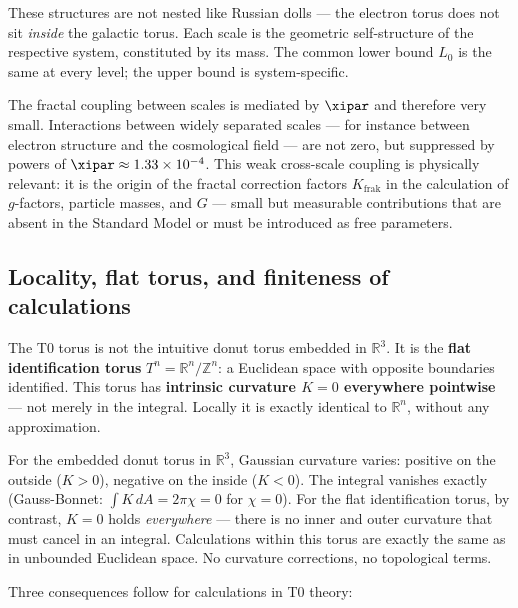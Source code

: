\begin{keypoint}
These structures are not nested like Russian dolls — the electron torus does not sit \textit{inside} the galactic torus. Each scale is the geometric self-structure of the respective system, constituted by its mass. The common lower bound $L_0$ is the same at every level; the upper bound is system-specific.

The fractal coupling between scales is mediated by $\xipar$ and therefore very small. Interactions between widely separated scales — for instance between electron structure and the cosmological field — are not zero, but suppressed by powers of $\xipar \approx 1{.}33 \times 10^{-4}$. This weak cross-scale coupling is physically relevant: it is the origin of the fractal correction factors $K_{\text{frak}}$ in the calculation of $g$-factors, particle masses, and $G$ — small but measurable contributions that are absent in the Standard Model or must be introduced as free parameters.
\end{keypoint}

\subsection{Locality, flat torus, and finiteness of calculations}

The T0 torus is not the intuitive donut torus embedded in $\mathbb{R}^3$. It is the \textbf{flat identification torus} $T^n = \mathbb{R}^n / \mathbb{Z}^n$: a Euclidean space with opposite boundaries identified. This torus has \textbf{intrinsic curvature $K = 0$ everywhere pointwise} — not merely in the integral. Locally it is exactly identical to $\mathbb{R}^n$, without any approximation.

\begin{keypoint}
For the embedded donut torus in $\mathbb{R}^3$, Gaussian curvature varies: positive on the outside ($K > 0$), negative on the inside ($K < 0$). The integral vanishes exactly (Gauss-Bonnet: $\int K\,dA = 2\pi\chi = 0$ for $\chi = 0$). For the flat identification torus, by contrast, $K = 0$ holds \emph{everywhere} — there is no inner and outer curvature that must cancel in an integral. Calculations within this torus are exactly the same as in unbounded Euclidean space. No curvature corrections, no topological terms.
\end{keypoint}

Three consequences follow for calculations in T0 theory:

